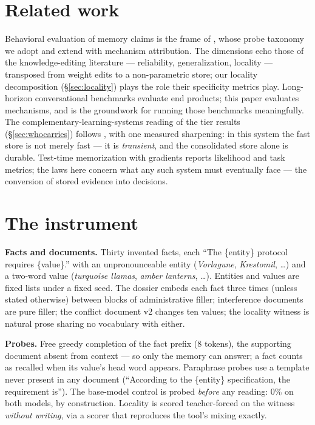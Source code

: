 \documentclass[11pt]{article}
\begin{document}
\section{Related work}

Behavioral evaluation of memory claims is the frame of \cite{beyondppl}, whose probe taxonomy we adopt and extend with mechanism attribution. The dimensions echo those of the knowledge-editing literature --- reliability, generalization, locality \cite{rome,memit} --- transposed from weight edits to a non-parametric store; our locality decomposition (\S\ref{sec:locality}) plays the role their specificity metrics play. Long-horizon conversational benchmarks \cite{longmemeval} evaluate end products; this paper evaluates mechanisms, and is the groundwork for running those benchmarks meaningfully. The complementary-learning-systems reading of the tier results (\S\ref{sec:whocarries}) follows \cite{mcclelland,kumaran}, with one measured sharpening: in this system the fast store is not merely fast --- it is \emph{transient}, and the consolidated store alone is durable. Test-time memorization with gradients \cite{titans,ttt} reports likelihood and task metrics; the laws here concern what any such system must eventually face --- the conversion of stored evidence into decisions.

\section{The instrument}\label{sec:instrument}

\textbf{Facts and documents.} Thirty invented facts, each ``The \{entity\} protocol requires \{value\}.'' with an unpronounceable entity (\emph{Vorlagune}, \emph{Krestomil}, \dots) and a two-word value (\emph{turquoise llamas}, \emph{amber lanterns}, \dots). Entities and values are fixed lists under a fixed seed. The dossier embeds each fact three times (unless stated otherwise) between blocks of administrative filler; interference documents are pure filler; the conflict document v2 changes ten values; the locality witness is natural prose sharing no vocabulary with either.

\textbf{Probes.} Free greedy completion of the fact prefix (8 tokens), the supporting document absent from context --- so only the memory can answer; a fact counts as recalled when its value's head word appears. Paraphrase probes use a template never present in any document (``According to the \{entity\} specification, the requirement is''). The base-model control is probed \emph{before} any reading: 0\% on both models, by construction. Locality is scored teacher-forced on the witness \emph{without writing}, via a scorer that reproduces the tool's mixing exactly.
\end{document}
